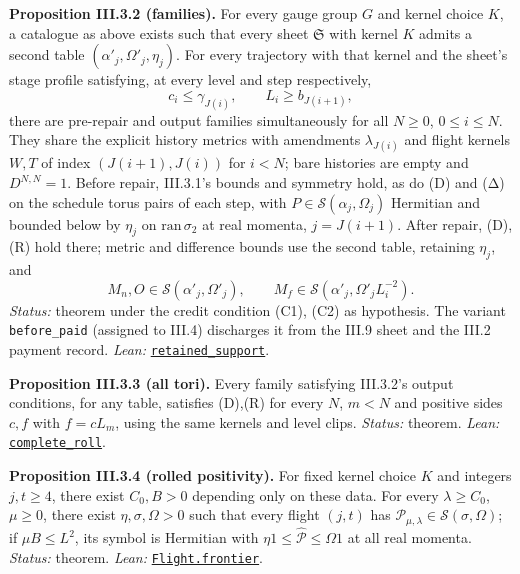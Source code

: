 \documentclass[
  letterpaper,
  11pt]{article}
\begin{document}
\textbf{Proposition III.3.2 (families).} For every gauge group \(G\) and
kernel choice \(K\), a catalogue as above exists such that every sheet
\(\mathfrak S\) with kernel \(K\) admits a second table
\((\alpha'_j,\Omega'_j,\eta_j)\). For every trajectory with that kernel
and the sheet's stage profile satisfying, at every level and step
respectively, \[c_i\le\gamma_{J(i)},\qquad L_i\ge b_{J(i+1)},\] there
are pre-repair and output families simultaneously for all \(N\ge0\),
\(0\le i\le N\). They share the explicit history metrics with amendments
\(\lambda_{J(i)}\) and flight kernels \(W,T\) of index \((J(i+1),J(i))\)
for \(i<N\); bare histories are empty and \(D^{N,N}=1\). Before repair,
III.3.1's bounds and symmetry hold, as do (D) and (Δ) on the schedule
torus pairs of each step, with \(P\in\mathcal S(\alpha_j,\Omega_j)\)
Hermitian and bounded below by \(\eta_j\) on \(\mathrm{ran}\,\sigma_2\)
at real momenta, \(j=J(i+1)\). After repair, (D),(R) hold there; metric
and difference bounds use the second table, retaining \(\eta_j\), and
\[M_n,O\in\mathcal S(\alpha'_j,\Omega'_j),\qquad M_f\in\mathcal S(\alpha'_j,\Omega'_jL_i^{-2}).\]
\emph{Status:} theorem under the credit condition (C1), (C2) as
hypothesis. The variant \texttt{before\_paid} (assigned to III.4)
discharges it from the III.9 sheet and the III.2 payment record.
\emph{Lean:}
\href{https://github.com/yang-mills-group/OpenAI-YM-20261028/blob/3456e5e75cf8d4cd558955a5c7638fba2d68f464/YM/Next/FREE_KERNELS/Rack.lean\#L134-L145}{\texttt{retained\_support}}.

\textbf{Proposition III.3.3 (all tori).} Every family satisfying
III.3.2's output conditions, for any table, satisfies (D),(R) for every
\(N\), \(m<N\) and positive sides \(c,f\) with \(f=cL_m\), using the
same kernels and level clips. \emph{Status:} theorem. \emph{Lean:}
\href{https://github.com/yang-mills-group/OpenAI-YM-20261028/blob/3456e5e75cf8d4cd558955a5c7638fba2d68f464/YM/UVNext/PRICED_KERNELS/Tori.lean\#L109-L157}{\texttt{complete\_roll}}.

\textbf{Proposition III.3.4 (rolled positivity).} For fixed kernel
choice \(K\) and integers \(j,t\ge4\), there exist \(C_0,B>0\) depending
only on these data. For every \(\lambda\ge C_0\), \(\mu\ge0\), there
exist \(\eta,\sigma,\Omega>0\) such that every flight \((j,t)\) has
\(\mathcal P_{\mu,\lambda}\in\mathcal S(\sigma,\Omega)\); if
\(\mu B\le L^2\), its symbol is Hermitian with
\(\eta1\le\hat{\mathcal P}\le\Omega1\) at all real momenta.
\emph{Status:} theorem. \emph{Lean:}
\href{https://github.com/yang-mills-group/OpenAI-YM-20261028/blob/3456e5e75cf8d4cd558955a5c7638fba2d68f464/YM/Next/FREE_KERNELS/Eject.lean\#L99-L140}{\texttt{Flight.frontier}}.
\end{document}
